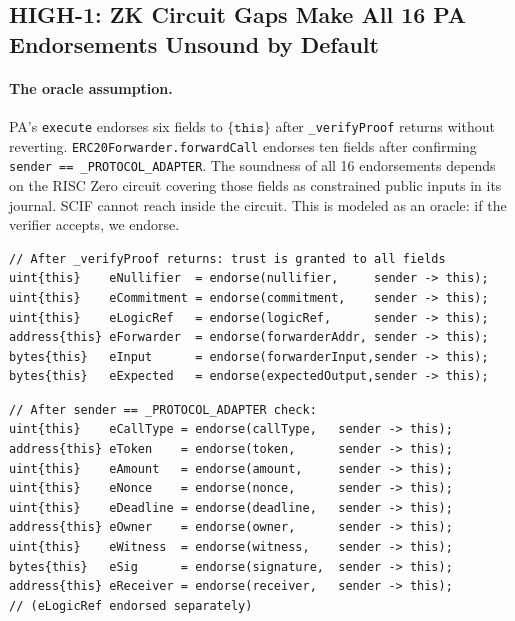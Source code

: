 \documentclass[11pt,a4paper]{article}
\begin{document}
\subsection{HIGH-1: ZK Circuit Gaps Make All 16 PA Endorsements Unsound by Default}
\label{sec:high1}

\paragraph{The oracle assumption.}
PA's \texttt{execute} endorses six fields to $\{\texttt{this}\}$ after
\texttt{\_verifyProof} returns without reverting.
\texttt{ERC20Forwarder.forwardCall} endorses ten fields after confirming
\texttt{sender == \_PROTOCOL\_ADAPTER}. The soundness of all 16 endorsements
depends on the RISC Zero circuit covering those fields as constrained public
inputs in its journal. SCIF cannot reach inside the circuit. This is modeled as
an oracle: if the verifier accepts, we endorse.

\begin{lstlisting}[style=scifstyle,caption={Six post-proof endorsements in \texttt{ProtocolAdapterCore.scif:89--94}.}]
// After _verifyProof returns: trust is granted to all fields
uint{this}    eNullifier  = endorse(nullifier,     sender -> this);
uint{this}    eCommitment = endorse(commitment,    sender -> this);
uint{this}    eLogicRef   = endorse(logicRef,      sender -> this);
address{this} eForwarder  = endorse(forwarderAddr, sender -> this);
bytes{this}   eInput      = endorse(forwarderInput,sender -> this);
bytes{this}   eExpected   = endorse(expectedOutput,sender -> this);
\end{lstlisting}

\begin{lstlisting}[style=scifstyle,caption={Ten post-access-check endorsements in \texttt{ERC20Forwarder.scif:149--158}.}]
// After sender == _PROTOCOL_ADAPTER check:
uint{this}    eCallType = endorse(callType,   sender -> this);
address{this} eToken    = endorse(token,      sender -> this);
uint{this}    eAmount   = endorse(amount,     sender -> this);
uint{this}    eNonce    = endorse(nonce,      sender -> this);
uint{this}    eDeadline = endorse(deadline,   sender -> this);
address{this} eOwner    = endorse(owner,      sender -> this);
uint{this}    eWitness  = endorse(witness,    sender -> this);
bytes{this}   eSig      = endorse(signature,  sender -> this);
address{this} eReceiver = endorse(receiver,   sender -> this);
// (eLogicRef endorsed separately)
\end{lstlisting}
\end{document}
